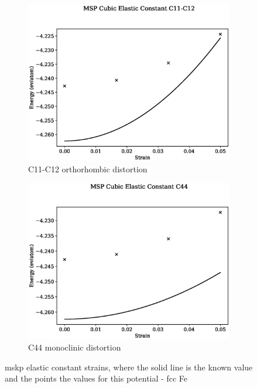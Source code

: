 \begin{figure}[htb]
\begin{subfigure}{.42\textwidth}
  \centering
  \includegraphics[width=.90\linewidth]{chapters/potentials_fe_pd_ru/fepd_potential/ec_mskp/msp_c11_c12_plot_bp_1.eps}  
  \caption{C11-C12 orthorhombic distortion}
  \label{fig:fepd-fefcc-c11c12}
\end{subfigure}
\begin{subfigure}{.42\textwidth}
  \centering
  \includegraphics[width=.90\linewidth]{chapters/potentials_fe_pd_ru/fepd_potential/ec_mskp/msp_c44_plot_bp_1.eps}  
  \caption{C44 monoclinic distortion}
  \label{fig:fepd-fefcc-c11c12c44}
\end{subfigure}
\label{fig:fig:fepd-fefcc-equation-of-state}
\caption{\acrshort{mskp} elastic constant strains, where the solid line is the known value and the points the values for this potential - \acrshort{fcc} Fe}
\end{figure}







